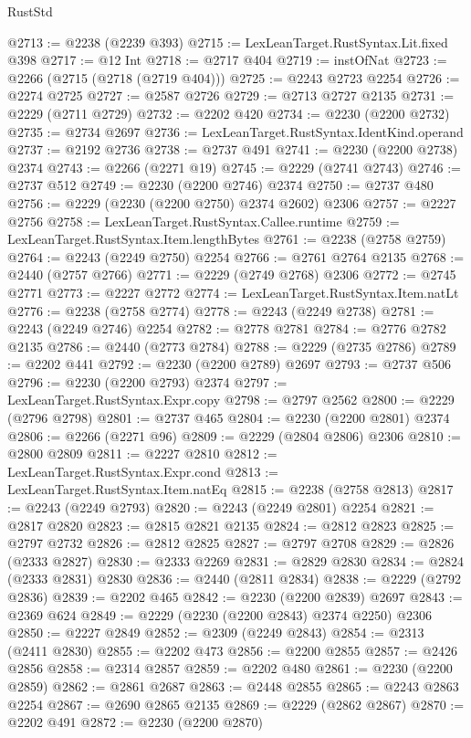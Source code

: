 \begin{lexlean}{RustStd}
\begin{coremodule}
{\begin{coremodule}
{{{{{{{{{{{{{{{{{{{{{{{{{{{{{{{{{{@2713 := @2238 (@2239 @393)
@2715 := LexLeanTarget.RustSyntax.Lit.fixed @398
@2717 := @12 Int
@2718 := @2717 @404
@2719 := instOfNat
@2723 := @2266 (@2715 (@2718 (@2719 @404)))
@2725 := @2243 @2723 @2254
@2726 := @2274 @2725
@2727 := @2587 @2726
@2729 := @2713 @2727 @2135
@2731 := @2229 (@2711 @2729)
@2732 := @2202 @420
@2734 := @2230 (@2200 @2732)
@2735 := @2734 @2697
@2736 := LexLeanTarget.RustSyntax.IdentKind.operand
@2737 := @2192 @2736
@2738 := @2737 @491
@2741 := @2230 (@2200 @2738) @2374
@2743 := @2266 (@2271 @19)
@2745 := @2229 (@2741 @2743)
@2746 := @2737 @512
@2749 := @2230 (@2200 @2746) @2374
@2750 := @2737 @480
@2756 := @2229 (@2230 (@2200 @2750) @2374 @2602) @2306
@2757 := @2227 @2756
@2758 := LexLeanTarget.RustSyntax.Callee.runtime
@2759 := LexLeanTarget.RustSyntax.Item.lengthBytes
@2761 := @2238 (@2758 @2759)
@2764 := @2243 (@2249 @2750) @2254
@2766 := @2761 @2764 @2135
@2768 := @2440 (@2757 @2766)
@2771 := @2229 (@2749 @2768) @2306
@2772 := @2745 @2771
@2773 := @2227 @2772
@2774 := LexLeanTarget.RustSyntax.Item.natLt
@2776 := @2238 (@2758 @2774)
@2778 := @2243 (@2249 @2738)
@2781 := @2243 (@2249 @2746) @2254
@2782 := @2778 @2781
@2784 := @2776 @2782 @2135
@2786 := @2440 (@2773 @2784)
@2788 := @2229 (@2735 @2786)
@2789 := @2202 @441
@2792 := @2230 (@2200 @2789) @2697
@2793 := @2737 @506
@2796 := @2230 (@2200 @2793) @2374
@2797 := LexLeanTarget.RustSyntax.Expr.copy
@2798 := @2797 @2562
@2800 := @2229 (@2796 @2798)
@2801 := @2737 @465
@2804 := @2230 (@2200 @2801) @2374
@2806 := @2266 (@2271 @96)
@2809 := @2229 (@2804 @2806) @2306
@2810 := @2800 @2809
@2811 := @2227 @2810
@2812 := LexLeanTarget.RustSyntax.Expr.cond
@2813 := LexLeanTarget.RustSyntax.Item.natEq
@2815 := @2238 (@2758 @2813)
@2817 := @2243 (@2249 @2793)
@2820 := @2243 (@2249 @2801) @2254
@2821 := @2817 @2820
@2823 := @2815 @2821 @2135
@2824 := @2812 @2823
@2825 := @2797 @2732
@2826 := @2812 @2825
@2827 := @2797 @2708
@2829 := @2826 (@2333 @2827)
@2830 := @2333 @2269
@2831 := @2829 @2830
@2834 := @2824 (@2333 @2831) @2830
@2836 := @2440 (@2811 @2834)
@2838 := @2229 (@2792 @2836)
@2839 := @2202 @465
@2842 := @2230 (@2200 @2839) @2697
@2843 := @2369 @624
@2849 := @2229 (@2230 (@2200 @2843) @2374 @2250) @2306
@2850 := @2227 @2849
@2852 := @2309 (@2249 @2843)
@2854 := @2313 (@2411 @2830)
@2855 := @2202 @473
@2856 := @2200 @2855
@2857 := @2426 @2856
@2858 := @2314 @2857
@2859 := @2202 @480
@2861 := @2230 (@2200 @2859)
@2862 := @2861 @2687
@2863 := @2448 @2855
@2865 := @2243 @2863 @2254
@2867 := @2690 @2865 @2135
@2869 := @2229 (@2862 @2867)
@2870 := @2202 @491
@2872 := @2230 (@2200 @2870)
}}}}}}}}}}}}}}}}}}}}}}}}}}}}}}}}}}
\end{coremodule}}
\end{coremodule}
\end{lexlean}
